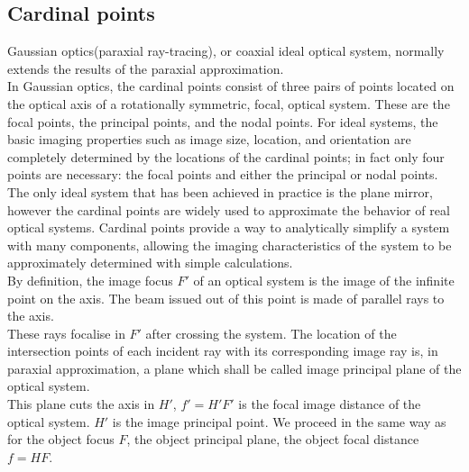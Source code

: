 \documentclass[../main.tex]{subfiles}
\begin{document}
	\subsection{Cardinal points}
	Gaussian optics(paraxial ray-tracing), or coaxial ideal optical system, normally extends the results of the paraxial approximation.\\
	In Gaussian optics, the cardinal points consist of three pairs of points located on the optical axis of a rotationally symmetric, focal, optical system. These are the focal points, the principal points, and the nodal points. For ideal systems, the basic imaging properties such as image size, location, and orientation are completely determined by the locations of the cardinal points; in fact only four points are necessary: the focal points and either the principal or nodal points. The only ideal system that has been achieved in practice is the plane mirror, however the cardinal points are widely used to approximate the behavior of real optical systems. Cardinal points provide a way to analytically simplify a system with many components, allowing the imaging characteristics of the system to be approximately determined with simple calculations.\\
	By definition, the image focus $F'$ of an optical system is the image of the infinite point on the axis. The beam issued out of this point is made of parallel rays to the axis.\\
	These rays focalise in $F'$ after crossing the system. The location of the intersection points of each incident ray with its corresponding image ray is, in paraxial approximation, a plane which shall be called image principal plane of the optical system.\\
	This plane cuts the axis in $H'$, $f'=H'F'$ is the focal image distance of the optical system. $H'$ is the image principal point. We proceed in the same way as for the object focus $F$, the object principal plane, the object focal distance $f=HF$.
\end{document}
